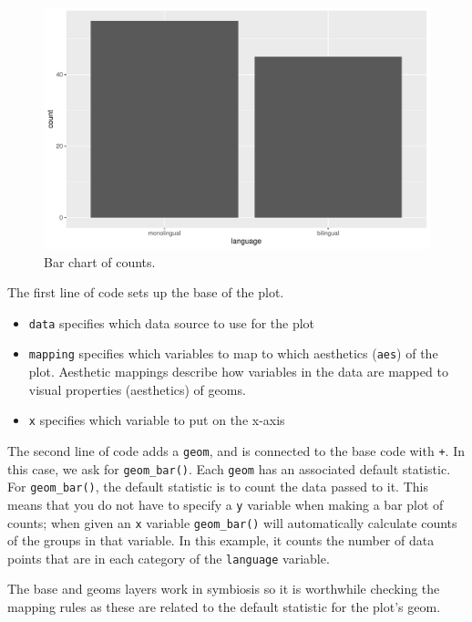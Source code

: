 \documentclass[
  english,
  doc,floatsintext]{apa6}
\begin{document}
\begin{figure}

{\centering \includegraphics[width=1\linewidth]{images/bar1-1} 

}

\caption{Bar chart of counts.}\label{fig:bar1}
\end{figure}

The first line of code sets up the base of the plot.

\begin{itemize}
\item
  \texttt{data} specifies which data source to use for the plot
\item
  \texttt{mapping} specifies which variables to map to which aesthetics (\texttt{aes}) of the plot. Aesthetic mappings describe how variables in the data are mapped to visual properties (aesthetics) of geoms.
\item
  \texttt{x} specifies which variable to put on the x-axis
\end{itemize}

The second line of code adds a \texttt{geom}, and is connected to the base code with \texttt{+}. In this case, we ask for \texttt{geom\_bar()}. Each \texttt{geom} has an associated default statistic. For \texttt{geom\_bar()}, the default statistic is to count the data passed to it. This means that you do not have to specify a \texttt{y} variable when making a bar plot of counts; when given an \texttt{x} variable \texttt{geom\_bar()} will automatically calculate counts of the groups in that variable. In this example, it counts the number of data points that are in each category of the \texttt{language} variable.

The base and geoms layers work in symbiosis so it is worthwhile checking the mapping rules as these are related to the default statistic for the plot's geom.
\end{document}

